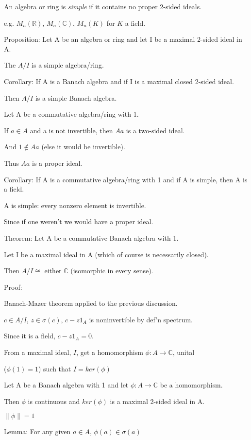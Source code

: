 \documentclass[12pt]{article}
\newcommand{\n}{\noindent}
\begin{document}
\noindent
An algebra or ring is \textit{simple} if it contains no proper 2-sided ideals.

e.g. $M_n(\mathds{R})$, $M_n(\mathds{C})$, $M_n(K)$ for $K$ a field.

\n
Proposition: Let A be an algebra or ring and let I be a maximal 2-sided ideal in A.

The $A \slash I$ is a simple algebra/ring.

\n
Corollary: If A is a Banach algebra and if I is a maximal closed 2-sided ideal.

Then $A \slash I$ is a simple Banach algebra.

\n
Let A be a commutative algebra/ring with 1.

If $a \in A$ and a is not invertible, then $Aa$ is a two-sided ideal.

And $1 \not\in Aa$ (else it would be invertible).

Thus $Aa$ is a proper ideal.

\n
Corollary: If A is a commutative algebra/ring with 1 and if A is simple, then A is a field.

A is simple: every nonzero element is invertible.

Since if one weren't we would have a proper ideal.

\n
Theorem: Let A be a commutative Banach algebra with 1.

Let I be a maximal ideal in A (which of course is necessarily closed).

Then $A \slash I \cong$ either $\mathds{C}$ (isomorphic in every sense).

\n
Proof:

Banach-Mazer theorem applied to the previous discussion.

\n
$c \in A\slash I$, $z \in \sigma(c)$, $c - z1_{A}$ is noninvertible by def'n spectrum.

Since it is a field, $c - z1_{A} = 0$.

\n
From a maximal ideal, $I$, get a homomorphism $\phi: A \to \mathds{C}$, unital

($\phi(1) = 1$) such that $I = ker(\phi)$

\n
Let A be a Banach algebra with 1 and let $\phi: A \to \mathds{C}$ be a homomorphism.

Then $\phi$ is continuous and $ker(\phi)$ is a maximal 2-sided ideal in A.

$\|\phi\| = 1$

\n
Lemma: For any given $a \in A$, $\phi(a) \in \sigma(a)$
\end{document}
